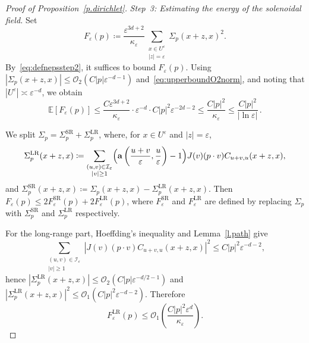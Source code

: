 \documentclass[11pt]{amsart}
\theoremstyle{plain}
\theoremstyle{definition}
\theoremstyle{remark}
\newcommand{\E}{\mathbb{E}}
\renewcommand{\a}{\mathbf{a}}
\newcommand{\eps}{\varepsilon}
\begin{document}
\begin{proof}[Proof of Proposition~\ref{p.dirichlet}]
		\medskip
		
		\emph{Step~3: Estimating the energy of the solenoidal field.}
		Set
		\[
		F_\eps(p) \coloneqq \frac{\eps^{3d+2}}{\kappa_\eps} \sum_{\substack{x \in U^\eps \\ |z| = \eps}} \Sigma_p(x+z,x)^2.
		\]
		By~\eqref{eq:defnepsstep2}, it suffices to bound $F_\eps(p)$.
		Using $|\Sigma_p(x+z,x)| \le \mathcal{O}_2(C|p|\eps^{-d-1})$ and~\eqref{eq:upperboundO2norm}, and noting that $|U^\eps| \asymp \eps^{-d}$, we obtain
		\begin{equation} \label{eq:expectationF}
			\E[F_\eps(p)] \le \frac{C\eps^{3d+2}}{\kappa_\eps} \cdot \eps^{-d} \cdot C|p|^2\eps^{-2d-2} \le \frac{C|p|^2}{\kappa_\eps} \le \frac{C|p|^2}{|\ln\eps|}\,.
		\end{equation}
		
		We split $\Sigma_p = \Sigma_p^{\mathrm{SR}} + \Sigma_p^{\mathrm{LR}}$, where, for $x \in U^\eps$ and $|z| = \eps$,
		\[
		\Sigma_p^{\mathrm{LR}}(x+z,x) \coloneqq \sum_{\substack{(u,v) \in \mathcal{I}_\eps \\ |v| \ge 1}} \Bigl(\a\left(\frac{u+v}{\eps},\frac{u}{\eps}\right) - 1\Bigr) J(v)(p \cdot v) C_{u+v,u}(x+z,x),
		\]
		and $\Sigma_p^{\mathrm{SR}}(x+z,x) \coloneqq \Sigma_p(x+z,x) - \Sigma_p^{\mathrm{LR}}(x+z,x)$.
		Then $F_\eps(p) \le 2 F_\eps^{\mathrm{SR}}(p) + 2 F_\eps^{\mathrm{LR}}(p)$, where $F_\eps^{\mathrm{SR}}$ and $F_\eps^{\mathrm{LR}}$ are defined by replacing $\Sigma_p$ with $\Sigma_p^{\mathrm{SR}}$ and $\Sigma_p^{\mathrm{LR}}$ respectively.
		
		For the long-range part, Hoeffding's inequality and Lemma~\ref{l.path} give
		\[
		\sum_{\substack{(u,v) \in \mathcal{I}_\eps \\ |v| \ge 1}} |J(v)(p \cdot v) C_{u+v,u}(x+z,x)|^2 \le C|p|^2\eps^{-d-2},
		\]
		hence $|\Sigma_p^{\mathrm{LR}}(x+z,x)| \le \mathcal{O}_2(C|p|\eps^{-d/2-1})$ and $|\Sigma_p^{\mathrm{LR}}(x+z,x)|^2 \le \mathcal{O}_1(C|p|^2\eps^{-d-2})$.
		Therefore
		\begin{equation} \label{eq:estimateLRterm}
			F_\eps^{\mathrm{LR}}(p) \le \mathcal{O}_1\left(\frac{C|p|^2\eps^d}{\kappa_\eps}\right).
		\end{equation}
		

\end{proof}
\end{document}
